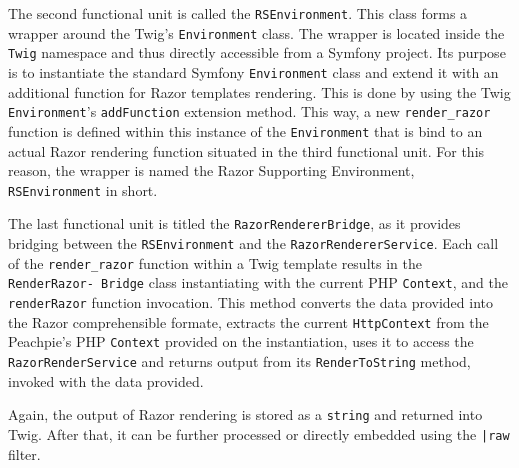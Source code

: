 The second functional unit is called the \texttt{RSEnvironment}. This class forms a wrapper around the Twig's \texttt{Environment} class. The wrapper is located inside the \texttt{Twig} namespace and thus directly accessible from a Symfony project. Its purpose is to instantiate the standard Symfony \texttt{Environment} class and extend it with an additional function for Razor templates rendering. This is done by using the Twig \texttt{Environment}'s \texttt{addFunction} extension method. This way, a new \texttt{render\_razor} function is defined within this instance of the \texttt{Environment} that is bind to an actual Razor rendering function situated in the third functional unit. For this reason, the wrapper is named the Razor Supporting Environment, \texttt{RSEnvironment} in short.  

The last functional unit is titled the \texttt{RazorRendererBridge}, as it provides bridging between the \texttt{RSEnvironment} and the \texttt{RazorRendererService}. Each call of the \texttt{render\_razor} function within a Twig template results in the \texttt{RenderRazor- Bridge} class instantiating with the current PHP \texttt{Context}, and the \texttt{renderRazor} function invocation. This method converts the data provided into the Razor comprehensible formate, extracts the current \texttt{HttpContext} from the Peachpie's PHP \texttt{Context} provided on the instantiation, uses it to access the \texttt{RazorRenderService} and returns output from its \texttt{RenderToString} method, invoked with the data provided. 

Again, the output of Razor rendering is stored as a \texttt{string} and returned into Twig. After that, it can be further processed or directly embedded using the \texttt{|raw} filter.
